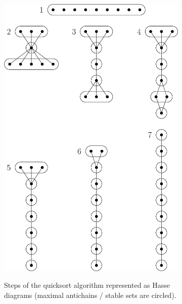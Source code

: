 \begin{figure}
	\centering
	\begin{subfigure}[b]{0.4\textwidth}
		{\includegraphics[width=\textwidth]{fig/supi/quicksort}}
		\caption{Steps of the quicksort algorithm represented as Hasse diagrams (maximal antichains / stable sets are circled).}
		\label{fig:supi:quicksort}
	\end{subfigure}
	\begin{subfigure}[b]{0.4\textwidth}

\end{subfigure}
\end{figure}
